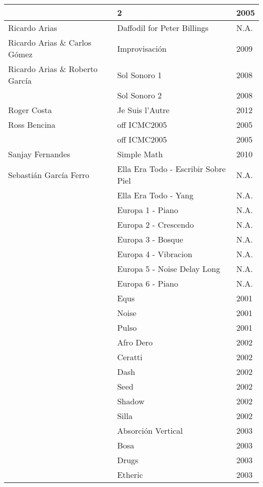 \begin{center}
\begin{longtable}{ p{}  p{}  p{} }
& 2 & 2005 \\ \midrule 
Ricardo Arias &  Daffodil for Peter Billings & N.A. \\ \midrule
Ricardo Arias \& Carlos Gómez & Improvisación & 2009 \\ \midrule
Ricardo Arias \& Roberto García & Sol Sonoro 1 & 2008 \\ \cmidrule (r){2-3} 
& Sol Sonoro 2 & 2008 \\ \midrule 
Roger Costa & Je Suis l'Autre & 2012 \\ \midrule 
Ross Bencina & off ICMC2005 & 2005 \\ \cmidrule (r){2-3} 
& off ICMC2005 & 2005 \\ \midrule 
Sanjay Fernandes & Simple Math & 2010 \\ \midrule 
Sebastián García Ferro & Ella Era Todo - Escribir Sobre Piel & N.A. \\ \cmidrule (r){2-3} 
& Ella Era Todo - Yang & N.A. \\ \cmidrule (r){2-3} 
& Europa 1 - Piano & N.A. \\ \cmidrule (r){2-3} 
& Europa 2 - Crescendo & N.A. \\ \cmidrule (r){2-3} 
& Europa 3 - Bosque & N.A. \\ \cmidrule (r){2-3} 
& Europa 4 - Vibracion & N.A. \\ \cmidrule (r){2-3} 
& Europa 5 - Noise Delay Long & N.A. \\ \cmidrule (r){2-3} 
& Europa 6 - Piano & N.A. \\ \cmidrule (r){2-3} 
& Equs & 2001 \\ \cmidrule (r){2-3} 
& Noise & 2001 \\ \cmidrule (r){2-3} 
& Pulso & 2001 \\ \cmidrule (r){2-3} 
& Afro Dero & 2002 \\ \cmidrule (r){2-3} 
& Ceratti & 2002 \\ \cmidrule (r){2-3} 
& Dash & 2002 \\ \cmidrule (r){2-3} 
& Seed & 2002 \\ \cmidrule (r){2-3} 
& Shadow & 2002 \\ \cmidrule (r){2-3} 
& Silla & 2002 \\ \cmidrule (r){2-3} 
& Absorción Vertical & 2003 \\ \cmidrule (r){2-3} 
& Bosa & 2003 \\ \cmidrule (r){2-3} 
& Drugs & 2003 \\ \cmidrule (r){2-3} 
& Etheric & 2003 \\ \cmidrule (r){2-3} 

\end{longtable}
\end{center}
